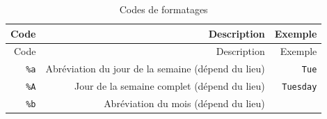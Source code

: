 \documentclass[12pt,]{book}
\numberwithin{equation}{section}
\numberwithin{countremarque}{section}
\begin{document}
\begin{longtable}[]{@{}rrr@{}}
\caption{Codes de formatages}\tabularnewline
\toprule
\begin{minipage}[b]{0.10\columnwidth}\raggedleft\strut
Code\strut
\end{minipage} & \begin{minipage}[b]{0.60\columnwidth}\raggedleft\strut
Description\strut
\end{minipage} & \begin{minipage}[b]{0.22\columnwidth}\raggedleft\strut
Exemple\strut
\end{minipage}\tabularnewline
\midrule
\endfirsthead
\toprule
\begin{minipage}[b]{0.10\columnwidth}\raggedleft\strut
Code\strut
\end{minipage} & \begin{minipage}[b]{0.60\columnwidth}\raggedleft\strut
Description\strut
\end{minipage} & \begin{minipage}[b]{0.22\columnwidth}\raggedleft\strut
Exemple\strut
\end{minipage}\tabularnewline
\midrule
\endhead
\begin{minipage}[t]{0.10\columnwidth}\raggedleft\strut
\texttt{\%a}\strut
\end{minipage} & \begin{minipage}[t]{0.60\columnwidth}\raggedleft\strut
Abréviation du jour de la semaine (dépend du lieu)\strut
\end{minipage} & \begin{minipage}[t]{0.22\columnwidth}\raggedleft\strut
\texttt{Tue}\strut
\end{minipage}\tabularnewline
\begin{minipage}[t]{0.10\columnwidth}\raggedleft\strut
\texttt{\%A}\strut
\end{minipage} & \begin{minipage}[t]{0.60\columnwidth}\raggedleft\strut
Jour de la semaine complet (dépend du lieu)\strut
\end{minipage} & \begin{minipage}[t]{0.22\columnwidth}\raggedleft\strut
\texttt{Tuesday}\strut
\end{minipage}\tabularnewline
\begin{minipage}[t]{0.10\columnwidth}\raggedleft\strut
\texttt{\%b}\strut
\end{minipage} & \begin{minipage}[t]{0.60\columnwidth}\raggedleft\strut
Abréviation du mois (dépend du lieu)\strut

\end{minipage}
\end{longtable}
\end{document}
